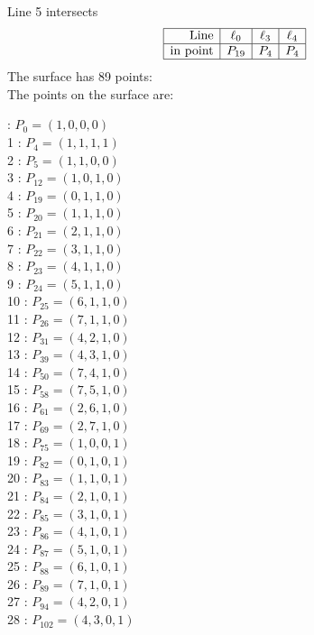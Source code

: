 \documentclass{article}
\begin{document}
{$$$$
Line 5 intersects 
$$
\begin{array}{|r*{3}{|c}|}
\hline
\mbox{Line}  & \ell_{0} & \ell_{3} & \ell_{4}\\
\hline
\mbox{in point}  & P_{19} & P_{4} & P_{4}\\
\hline
\end{array}
$$
The surface has 89 points:\\
The points on the surface are:\\
\begin{multicols}{3}
 : $P_{0}=( 1, 0, 0, 0 )$\\
1 : $P_{4}=( 1, 1, 1, 1 )$\\
2 : $P_{5}=( 1, 1, 0, 0 )$\\
3 : $P_{12}=( 1, 0, 1, 0 )$\\
4 : $P_{19}=( 0, 1, 1, 0 )$\\
5 : $P_{20}=( 1, 1, 1, 0 )$\\
6 : $P_{21}=( 2, 1, 1, 0 )$\\
7 : $P_{22}=( 3, 1, 1, 0 )$\\
8 : $P_{23}=( 4, 1, 1, 0 )$\\
9 : $P_{24}=( 5, 1, 1, 0 )$\\
10 : $P_{25}=( 6, 1, 1, 0 )$\\
11 : $P_{26}=( 7, 1, 1, 0 )$\\
12 : $P_{31}=( 4, 2, 1, 0 )$\\
13 : $P_{39}=( 4, 3, 1, 0 )$\\
14 : $P_{50}=( 7, 4, 1, 0 )$\\
15 : $P_{58}=( 7, 5, 1, 0 )$\\
16 : $P_{61}=( 2, 6, 1, 0 )$\\
17 : $P_{69}=( 2, 7, 1, 0 )$\\
18 : $P_{75}=( 1, 0, 0, 1 )$\\
19 : $P_{82}=( 0, 1, 0, 1 )$\\
20 : $P_{83}=( 1, 1, 0, 1 )$\\
21 : $P_{84}=( 2, 1, 0, 1 )$\\
22 : $P_{85}=( 3, 1, 0, 1 )$\\
23 : $P_{86}=( 4, 1, 0, 1 )$\\
24 : $P_{87}=( 5, 1, 0, 1 )$\\
25 : $P_{88}=( 6, 1, 0, 1 )$\\
26 : $P_{89}=( 7, 1, 0, 1 )$\\
27 : $P_{94}=( 4, 2, 0, 1 )$\\
28 : $P_{102}=( 4, 3, 0, 1 )$\\

\end{multicols}}
\end{document}
